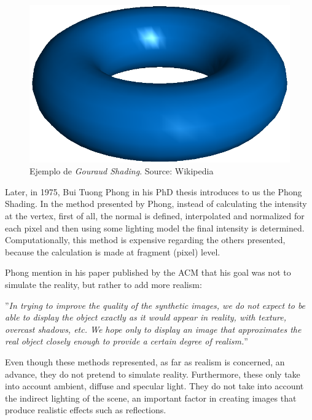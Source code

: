 \documentclass[titlepage,12pt]{report}
\begin{document}
\begin{figure}[ht]
	\centering
	\includegraphics[scale=0.25]{media/Gouraudshading00.png}
	\caption{Ejemplo de \textit{Gouraud Shading}. Source: Wikipedia}
	\label{Gouraud:shading}
\end{figure}

Later, in 1975, Bui Tuong Phong in his PhD thesis \citep[pp.~311--317]{Phong1975} introduces to us the Phong Shading. In the method presented by Phong, instead of calculating the intensity at the vertex, first of all, the normal is defined, interpolated and normalized for each pixel and then using some lighting model the final intensity is determined. Computationally, this method is expensive regarding the others presented, because the calculation is made at fragment (pixel) level.

Phong mention in his paper published by the ACM \citep[p.~311]{Phong1975} that his goal was not to simulate the reality, but rather to add more realism:
\vspace{5mm}

\begin{mdframed}[hidealllines=true,backgroundcolor=gray!20] ''\textit{In trying to improve the quality of the synthetic images, we do not expect to be able to display the object exactly as it would appear in reality, with texture, overcast shadows, etc. We hope only to display an image that approximates the real object closely enough to provide a certain degree of realism.}'' 
\end{mdframed}

Even though these methods represented, as far as realism is concerned, an advance, they do not pretend to simulate reality. Furthermore, these only take into account ambient, diffuse and specular light. They do not take into account the indirect lighting of the scene, an important factor in creating images that produce realistic effects such as reflections.
\end{document}
